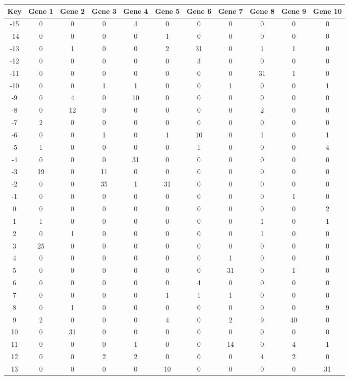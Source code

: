 \begin{tabular}{|c|c|c|c|c|c|c|c|c|c|c|}
\hline
Key & Gene 1 & Gene 2 & Gene 3 & Gene 4 & Gene 5 & Gene 6 & Gene 7 & Gene 8 & Gene 9 & Gene 10 \\
\hline
-15 & 0 & 0 & 0 & 4 & 0 & 0 & 0 & 0 & 0 & 0 \\
-14 & 0 & 0 & 0 & 0 & 1 & 0 & 0 & 0 & 0 & 0 \\
-13 & 0 & 1 & 0 & 0 & 2 & 31 & 0 & 1 & 1 & 0 \\
-12 & 0 & 0 & 0 & 0 & 0 & 3 & 0 & 0 & 0 & 0 \\
-11 & 0 & 0 & 0 & 0 & 0 & 0 & 0 & 31 & 1 & 0 \\
-10 & 0 & 0 & 1 & 1 & 0 & 0 & 1 & 0 & 0 & 1 \\
-9 & 0 & 4 & 0 & 10 & 0 & 0 & 0 & 0 & 0 & 0 \\
-8 & 0 & 12 & 0 & 0 & 0 & 0 & 0 & 2 & 0 & 0 \\
-7 & 2 & 0 & 0 & 0 & 0 & 0 & 0 & 0 & 0 & 0 \\
-6 & 0 & 0 & 1 & 0 & 1 & 10 & 0 & 1 & 0 & 1 \\
-5 & 1 & 0 & 0 & 0 & 0 & 1 & 0 & 0 & 0 & 4 \\
-4 & 0 & 0 & 0 & 31 & 0 & 0 & 0 & 0 & 0 & 0 \\
-3 & 19 & 0 & 11 & 0 & 0 & 0 & 0 & 0 & 0 & 0 \\
-2 & 0 & 0 & 35 & 1 & 31 & 0 & 0 & 0 & 0 & 0 \\
-1 & 0 & 0 & 0 & 0 & 0 & 0 & 0 & 0 & 1 & 0 \\
0 & 0 & 0 & 0 & 0 & 0 & 0 & 0 & 0 & 0 & 2 \\
1 & 1 & 0 & 0 & 0 & 0 & 0 & 0 & 1 & 0 & 1 \\
2 & 0 & 1 & 0 & 0 & 0 & 0 & 0 & 1 & 0 & 0 \\
3 & 25 & 0 & 0 & 0 & 0 & 0 & 0 & 0 & 0 & 0 \\
4 & 0 & 0 & 0 & 0 & 0 & 0 & 1 & 0 & 0 & 0 \\
5 & 0 & 0 & 0 & 0 & 0 & 0 & 31 & 0 & 1 & 0 \\
6 & 0 & 0 & 0 & 0 & 0 & 4 & 0 & 0 & 0 & 0 \\
7 & 0 & 0 & 0 & 0 & 1 & 1 & 1 & 0 & 0 & 0 \\
8 & 0 & 1 & 0 & 0 & 0 & 0 & 0 & 0 & 0 & 9 \\
9 & 2 & 0 & 0 & 0 & 4 & 0 & 2 & 9 & 40 & 0 \\
10 & 0 & 31 & 0 & 0 & 0 & 0 & 0 & 0 & 0 & 0 \\
11 & 0 & 0 & 0 & 1 & 0 & 0 & 14 & 0 & 4 & 1 \\
12 & 0 & 0 & 2 & 2 & 0 & 0 & 0 & 4 & 2 & 0 \\
13 & 0 & 0 & 0 & 0 & 10 & 0 & 0 & 0 & 0 & 31 \\
\hline
\end{tabular}